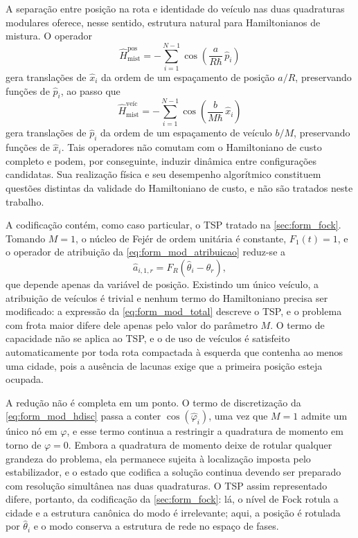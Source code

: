         A separação entre posição na rota e identidade do veículo nas duas quadraturas modulares oferece, nesse sentido, estrutura natural para Hamiltonianos de mistura. O operador
        \begin{equation}\label{eq:form_mod_mixer_pos}
            \hat{H}_{\text{mist}}^{\text{pos}} = - \sum_{i=1}^{N-1}
            \cos\!\left( \frac{a}{R\hbar}\, \hat{p}_i \right)
        \end{equation}
        \noindent gera translações de $\hat{x}_i$ da ordem de um espaçamento de posição $a/R$, preservando funções de $\hat{p}_i$, ao passo que
        \begin{equation}\label{eq:form_mod_mixer_veh}
            \hat{H}_{\text{mist}}^{\text{veíc}} = - \sum_{i=1}^{N-1}
            \cos\!\left( \frac{b}{M\hbar}\, \hat{x}_i \right)
        \end{equation}
        \noindent gera translações de $\hat{p}_i$ da ordem de um espaçamento de veículo $b/M$, preservando funções de $\hat{x}_i$. Tais operadores não comutam com o Hamiltoniano de custo completo e podem, por conseguinte, induzir dinâmica entre configurações candidatas. Sua realização física e seu desempenho algorítmico constituem questões distintas da validade do Hamiltoniano de custo, e não são tratados neste trabalho.

        A codificação contém, como caso particular, o TSP tratado na \autoref{sec:form_fock}. Tomando $M = 1$, o núcleo de Fejér de ordem unitária é constante, $F_1(t) = 1$, e o operador de atribuição da \autoref{eq:form_mod_atribuicao} reduz-se a
        \begin{equation}\label{eq:form_mod_tsp}
            \hat{a}_{i,1,r} = F_R\!\left( \hat{\theta}_i - \theta_r \right) ,
        \end{equation}
        \noindent que depende apenas da variável de posição. Existindo um único veículo, a atribuição de veículos é trivial e nenhum termo do Hamiltoniano precisa ser modificado: a expressão da \autoref{eq:form_mod_total} descreve o TSP, e o problema com frota maior difere dele apenas pelo valor do parâmetro $M$. O termo de capacidade não se aplica ao TSP, e o de uso de veículos é satisfeito automaticamente por toda rota compactada à esquerda que contenha ao menos uma cidade, pois a ausência de lacunas exige que a primeira posição esteja ocupada.

        A redução não é completa em um ponto. O termo de discretização da \autoref{eq:form_mod_hdisc} passa a conter $\cos(\hat{\varphi}_i)$, uma vez que $M = 1$ admite um único nó em $\varphi$, e esse termo continua a restringir a quadratura de momento em torno de $\varphi = 0$. Embora a quadratura de momento deixe de rotular qualquer grandeza do problema, ela permanece sujeita à localização imposta pelo estabilizador, e o estado que codifica a solução continua devendo ser preparado com resolução simultânea nas duas quadraturas. O TSP assim representado difere, portanto, da codificação da \autoref{sec:form_fock}: lá, o nível de Fock rotula a cidade e a estrutura canônica do modo é irrelevante; aqui, a posição é rotulada por $\hat{\theta}_i$ e o modo conserva a estrutura de rede no espaço de fases.

